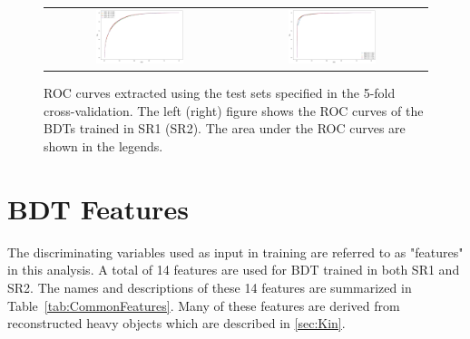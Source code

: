 \begin{figure}[tbh!]
 \begin{center}
 \begin{tabular}{cc}
 \includegraphics[width=0.48\textwidth]{figures/Part3/BDT/5foldTT}&
 \includegraphics[width=0.48\textwidth]{figures/Part3/BDT/5foldST}\\
 \end{tabular}
 \caption{\ac{ROC} curves extracted using the test sets specified in the 5-fold cross-validation. The left (right) figure shows the \ac{ROC} curves of the \acp{BDT} trained in \ac{SR}1 (\ac{SR}2). The area under the \ac{ROC} curves are shown in the legends.}
 \label{fig:ROC}
 \end{center}
\end{figure}

\section{BDT Features}
\label{sec:Input}

The discriminating variables used as input in training are referred to as "features" in this analysis. A total of 14 features are used for \ac{BDT} trained in both \ac{SR}1 and \ac{SR}2. The names and descriptions of these 14 features are summarized in Table~\ref{tab:CommonFeatures}. Many of these features are derived from reconstructed heavy objects which are described in \autoref{sec:Kin}.


